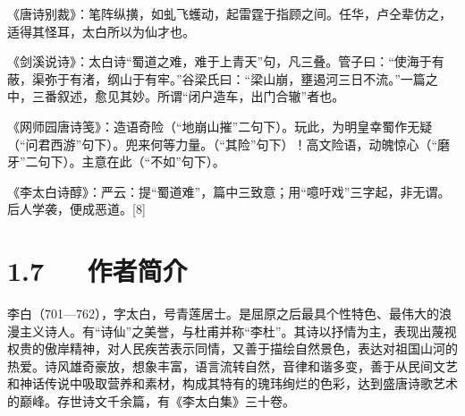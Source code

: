 \documentclass[letterpaper,12pt,english]{sphinxmanual}
\begin{document}
《唐诗别裁》：笔阵纵撗，如虬飞蠖动，起雷霆于指顾之间。任华，卢仝辈仿之，适得其怪耳，太白所以为仙才也。

《剑溪说诗》：太白诗“蜀道之难，难于上青天”句，凡三叠。管子曰：“使海于有蔽，渠弥于有渚，纲山于有牢。”谷梁氏曰：“梁山崩，壅遏河三日不流。”一篇之中，三番叙述，愈见其妙。所谓“闭户造车，出门合辙”者也。

《网师园唐诗笺》：造语奇险（“地崩山摧”二句下）。玩此，为明皇幸蜀作无疑（“问君西游”句下）。兜来何等力量。（“其险”句下）！高文险语，动魄惊心（“磨牙”二句下）。主意在此（“不如”句下）。

《李太白诗醇》：严云：提“蜀道难”，篇中三致意；用“噫吁戏”三字起，非无谓。后人学袭，便成恶道。{[}8{]}


\section{1.7   作者简介}
\label{\detokenize{p01_u6563_u6587/_u674e_u767d-_u8700_u9053_u96be:id9}}
李白（701—762），字太白，号青莲居士。是屈原之后最具个性特色、最伟大的浪漫主义诗人。有“诗仙”之美誉，与杜甫并称“李杜”。其诗以抒情为主，表现出蔑视权贵的傲岸精神，对人民疾苦表示同情，又善于描绘自然景色，表达对祖国山河的热爱。诗风雄奇豪放，想象丰富，语言流转自然，音律和谐多变，善于从民间文艺和神话传说中吸取营养和素材，构成其特有的瑰玮绚烂的色彩，达到盛唐诗歌艺术的巅峰。存世诗文千余篇，有《李太白集》三十卷。
\end{document}
